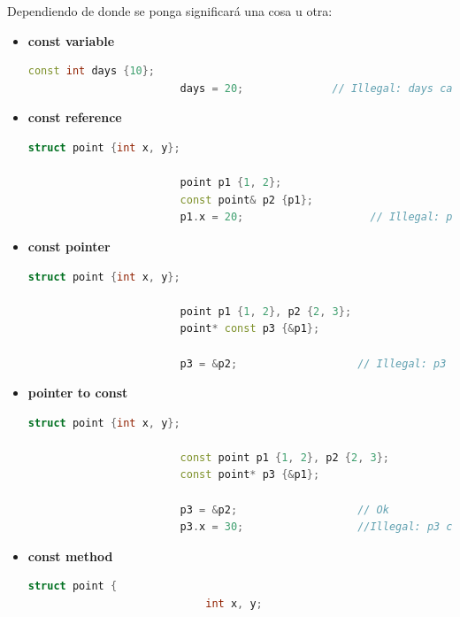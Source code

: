 \documentclass[12pt, fleqn]{report}                             %
\theoremstyle{break}                                            %
\begin{document}
            Dependiendo de donde se ponga significará una cosa u otra:
            \begin{itemize}
                \item \textbf{const variable}
                    \begin{lstlisting}[language=C++, gobble=24]
                        const int days {10};
                        days = 20;              // Illegal: days cannot change
                    \end{lstlisting}

                \item \textbf{const reference}
                    \begin{lstlisting}[language=C++, gobble=24]
                        struct point {int x, y};

                        point p1 {1, 2};
                        const point& p2 {p1};
                        p1.x = 20;                    // Illegal: point cannot change
                    \end{lstlisting}

                \item \textbf{const pointer}
                    \begin{lstlisting}[language=C++, gobble=24]
                        struct point {int x, y};

                        point p1 {1, 2}, p2 {2, 3};
                        point* const p3 {&p1};

                        p3 = &p2;                   // Illegal: p3 cannot change
                    \end{lstlisting}

                \item \textbf{pointer to const}
                    \begin{lstlisting}[language=C++, gobble=24]
                        struct point {int x, y};

                        const point p1 {1, 2}, p2 {2, 3};
                        const point* p3 {&p1};
                        
                        p3 = &p2;                   // Ok
                        p3.x = 30;                  //Illegal: p3 cannot change
                    \end{lstlisting}

                \clearpage
                \item \textbf{const method}
                    \begin{lstlisting}[language=C++, gobble=24]
                        struct point {
                            int x, y;


\end{lstlisting}
\end{itemize}
\end{document}
